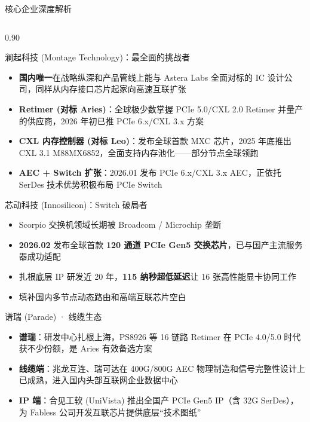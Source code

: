 \documentclass[aspectratio=169, 8pt, UTF8]{ctexbeamer}
\begin{document}
\begin{frame}{核心企业深度解析}
  \begin{columns}[T]
    \begin{column}{0.90\textwidth}
      \begin{block}{澜起科技 (Montage Technology)：最全面的挑战者}
        \scriptsize
        \begin{itemize}
          \item \textbf{国内唯一}在战略纵深和产品管线上能与 Astera Labs 全面对标的 IC 设计公司，同样从内存接口芯片起家向高速互联扩张
          \item \textbf{Retimer (对标 Aries)}：全球极少数掌握 PCIe 5.0/CXL 2.0 Retimer 并量产的供应商，2026 年初已推 PCIe 6.x/CXL 3.x 方案
          \item \textbf{CXL 内存控制器 (对标 Leo)}：发布全球首款 MXC 芯片，2025 年底推出 CXL 3.1 M88MX6852，全面支持内存池化——部分节点全球领跑
          \item \textbf{AEC + Switch 扩张}：2026.01 发布 PCIe 6.x/CXL 3.x AEC，正依托 SerDes 技术优势积极布局 PCIe Switch
        \end{itemize}
      \end{block}
      \begin{block}{芯动科技 (Innosilicon)：Switch 破局者}
        \scriptsize
        \begin{itemize}
          \item Scorpio 交换机领域长期被 Broadcom / Microchip 垄断
          \item \textbf{2026.02} 发布全球首款 \textbf{120 通道 PCIe Gen5 交换芯片}，已与国产主流服务器成功适配
          \item 扎根底层 IP 研发近 20 年，\textbf{115 纳秒超低延迟}让 16 张高性能显卡协同工作
          \item 填补国内多节点动态路由和高端互联芯片空白
        \end{itemize}
      \end{block}

      \vspace{4pt}

      \begin{exampleblock}{谱瑞 (Parade) · 线缆生态}
        \scriptsize
        \begin{itemize}
          \item \textbf{谱瑞}：研发中心扎根上海，PS8926 等 16 链路 Retimer 在 PCIe 4.0/5.0 时代获不少份额，是 Aries 有效备选方案
          \item \textbf{线缆端}：兆龙互连、瑞可达在 400G/800G AEC 物理制造和信号完整性设计上已成熟，进入国内头部互联网企业数据中心
          \item \textbf{IP 端}：合见工软 (UniVista) 推出全国产 PCIe Gen5 IP（含 32G SerDes），为 Fabless 公司开发互联芯片提供底层``技术图纸''
        \end{itemize}
      \end{exampleblock}
    \end{column}
  \end{columns}
\end{frame}
\end{document}
